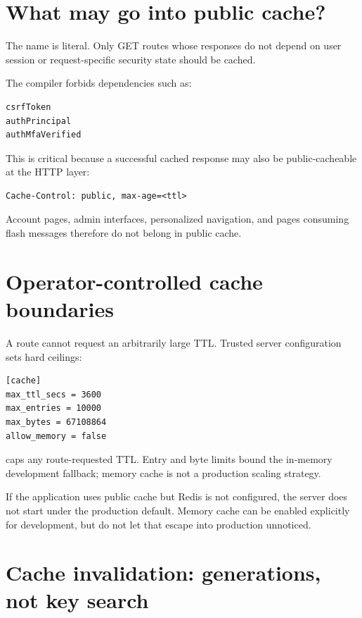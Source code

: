 \section{What may go into public cache?}

The name  is literal. Only GET routes whose responses do not depend on user session or request-specific security state should be cached.

The compiler forbids dependencies such as:

\begin{lstlisting}
csrfToken
authPrincipal
authMfaVerified
\end{lstlisting}

This is critical because a successful cached response may also be public-cacheable at the HTTP layer:

\begin{lstlisting}
Cache-Control: public, max-age=<ttl>
\end{lstlisting}

Account pages, admin interfaces, personalized navigation, and pages consuming flash messages therefore do not belong in public cache.

\section{Operator-controlled cache boundaries}

A route cannot request an arbitrarily large TTL. Trusted server configuration sets hard ceilings:

\begin{lstlisting}
[cache]
max_ttl_secs = 3600
max_entries = 10000
max_bytes = 67108864
allow_memory = false
\end{lstlisting}

 caps any route-requested TTL. Entry and byte limits bound the in-memory development fallback; memory cache is not a production scaling strategy.

If the application uses public cache but Redis is not configured, the server does not start under the production default. Memory cache can be enabled explicitly for development, but do not let that escape into production unnoticed.

\section{Cache invalidation: generations, not key search}

